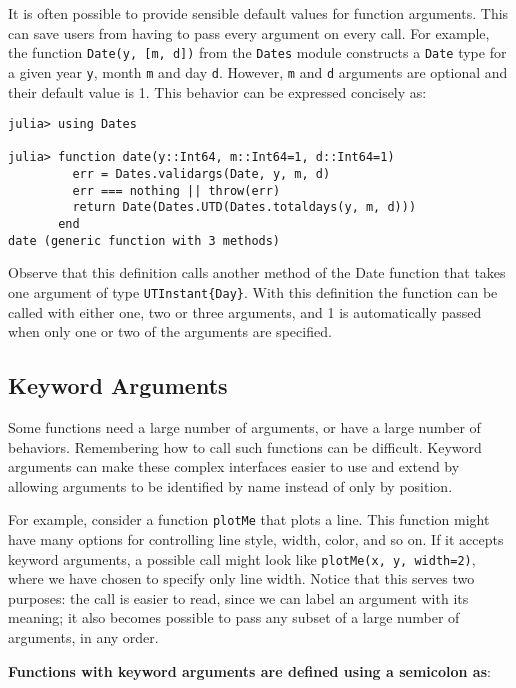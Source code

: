 \documentclass[
]{article}
\begin{document}
It is often possible to provide sensible default values for function
arguments. This can save users from having to pass every argument on
every call. For example, the function \texttt{Date(y,\ {[}m,\ d{]})}
from the \texttt{Dates} module constructs a \texttt{Date} type for a
given year \texttt{y}, month \texttt{m} and day \texttt{d}. However,
\texttt{m} and \texttt{d} arguments are optional and their default value
is 1. This behavior can be expressed concisely as:

\begin{verbatim}
julia> using Dates

julia> function date(y::Int64, m::Int64=1, d::Int64=1)
         err = Dates.validargs(Date, y, m, d)
         err === nothing || throw(err)
         return Date(Dates.UTD(Dates.totaldays(y, m, d)))
       end
date (generic function with 3 methods)
\end{verbatim}

Observe that this definition calls another method of the Date function
that takes one argument of type \texttt{UTInstant\{Day\}}. With this
definition the function can be called with either one, two or three
arguments, and 1 is automatically passed when only one or two of the
arguments are specified.

\hypertarget{keyword-arguments}{%
\subsection{Keyword Arguments}\label{keyword-arguments}}

Some functions need a large number of arguments, or have a large number
of behaviors. Remembering how to call such functions can be difficult.
Keyword arguments can make these complex interfaces easier to use and
extend by allowing arguments to be identified by name instead of only by
position.

For example, consider a function \texttt{plotMe} that plots a line. This
function might have many options for controlling line style, width,
color, and so on. If it accepts keyword arguments, a possible call might
look like \texttt{plotMe(x,\ y,\ width=2)}, where we have chosen to
specify only line width. Notice that this serves two purposes: the call
is easier to read, since we can label an argument with its meaning; it
also becomes possible to pass any subset of a large number of arguments,
in any order.

\textbf{Functions with keyword arguments are defined using a semicolon
as}:
\end{document}
